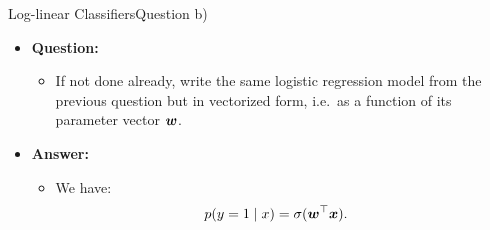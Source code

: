 \documentclass[t]{beamer}
\begin{document}
\begin{frame}{Log-linear Classifiers}{Question b)}
    \begin{itemize}
        \item \textbf{Question:}
              \begin{itemize}
                  \item If not done already, write the same logistic regression
                        model from the previous question but in vectorized form,
                        i.e.\ as a function of its parameter vector ${\boldsymbol{w}}$.
              \end{itemize}
              \pause
        \item \textbf{Answer:}
              \begin{itemize}
                  \item We have:
                        \begin{align}
                            p(y=1\mid x) & = \sigma({\boldsymbol{w}}^\top{\boldsymbol{x}}).
                        \end{align}
              \end{itemize}
    \end{itemize}
\end{frame}
\end{document}
